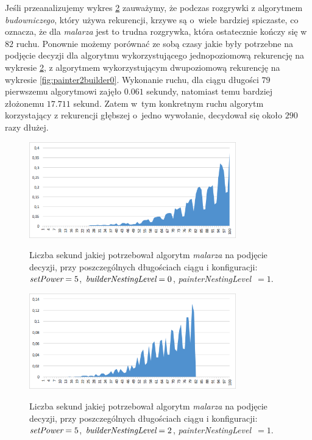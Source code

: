 \documentclass[document]{xmgr}
\begin{document}
Jeśli przeanalizujemy wykres \ref{fig:painter1builder2} zauważymy, że podczas rozgrywki z algorytmem \emph{budowniczego}, który używa rekurencji, krzywe są o~wiele bardziej spiczaste, co oznacza, że dla \emph{malarza} jest to trudna rozgrywka, która ostatecznie kończy się w~$82$ ruchu. Ponownie możemy porównać ze sobą czasy jakie były potrzebne na podjęcie decyzji dla algorytmu wykorzystującego jednopoziomową rekurencję na wykresie \ref{fig:painter1builder2}, z algorytmem wykorzystującym dwupoziomową rekurencję na wykresie \ref{fig:painter2builder0}. Wykonanie ruchu, dla ciągu długości $79$ pierwszemu algorytmowi zajęło $0.061$ sekundy, natomiast temu bardziej złożonemu $17.711$ sekund. Zatem w~tym konkretnym ruchu algorytm korzystający z rekurencji głębszej o~jedno wywołanie, decydował się około $290$ razy dłużej.

\begin{figure}[tbh]
    \centering
    \caption{Liczba sekund jakiej potrzebował algorytm \emph{malarza} na podjęcie decyzji, przy poszczególnych długościach ciągu i konfiguracji: $\emph{setPower}=5$, $\emph{builderNestingLevel}=0$, \emph{painterNestingLevel}~$=1$.}
    \includegraphics[width = 0.8\textwidth]{images/timePainter1Builder0}
    \label{fig:painter1builder0}
\end{figure}

\begin{figure}[tbh]
    \centering
    \caption{Liczba sekund jakiej potrzebował algorytm \emph{malarza} na podjęcie decyzji, przy poszczególnych długościach ciągu i konfiguracji: $\emph{setPower}=5$, $\emph{builderNestingLevel}=2$, \emph{painterNestingLevel}~$=1$.}
    \includegraphics[width = 0.8\textwidth]{images/timePainter1Builder2}
    \label{fig:painter1builder2}
\end{figure}
\end{document}

